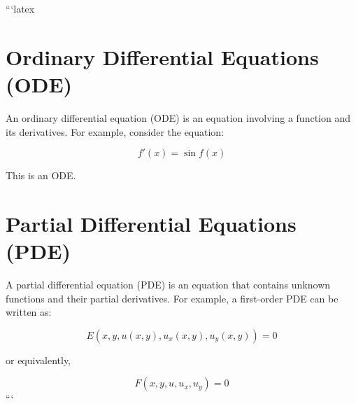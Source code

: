 ```latex
\section*{Ordinary Differential Equations (ODE)}

An ordinary differential equation (ODE) is an equation involving a function and its derivatives. For example, consider the equation:

\begin{equation}
f'(x) = \sin f(x)
\end{equation}

This is an ODE.

\section*{Partial Differential Equations (PDE)}

A partial differential equation (PDE) is an equation that contains unknown functions and their partial derivatives. For example, a first-order PDE can be written as:

\begin{equation}
E(x, y, u(x, y), u_x(x, y), u_y(x, y)) = 0
\end{equation}

or equivalently,

\begin{equation}
F(x, y, u, u_x, u_y) = 0
\end{equation}
```
